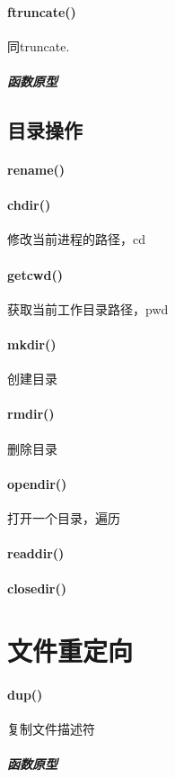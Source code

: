 \documentclass[UTF8,a4paper,12pt]{ctexbook}
\begin{document}
		\paragraph{ftruncate()}同truncate.
			\subparagraph{函数原型}
		
	\subsection{目录操作}
		\paragraph{rename()}
		
		\paragraph{chdir()} 修改当前进程的路径，cd
		
		\paragraph{getcwd()} 获取当前工作目录路径，pwd
		
		\paragraph{mkdir()} 创建目录
		
		\paragraph{rmdir()} 删除目录
		
		\paragraph{opendir()} 打开一个目录，遍历
		
		\paragraph{readdir()} 
		
		\paragraph{closedir()}
	
		
	\section{文件重定向}		
		\paragraph{dup()}复制文件描述符
			\subparagraph{函数原型}
				
\end{document}
